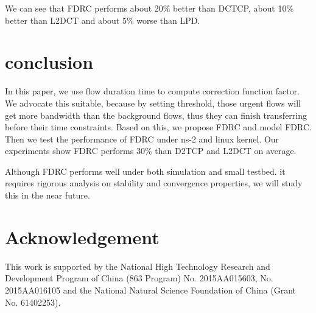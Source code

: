 \documentclass[10pt, conference, letterpaper]{IEEEtran}
\begin{document}
We can see that FDRC performs about 20\% better than DCTCP, about 10\% better than L2DCT and about 5\% worse than LPD. 
 



\section{conclusion} \label{conclusion}

In this paper, we use flow duration time to compute correction function factor.
We advocate this suitable, because by setting threshold, those urgent flows will get more bandwidth than the background flows, 
thus they can finish transferring before their time constraints. Based on this, we propose FDRC and model FDRC.
Then we test the performance of FDRC under ns-2 and linux kernel. Our experiments show FDRC
performs  30\% than D2TCP and L2DCT on average.


Although FDRC performs well under both simulation and small testbed. 
it requires rigorous analysis on stability and convergence properties,
we will study this in the near future.



\section{Acknowledgement}
This work is supported by the National High Technology Research and Development Program of China (863 Program) No. 2015AA015603, No. 2015AA016105
and the National Natural Science Foundation of China (Grant No. 61402253). 








\end{document}
